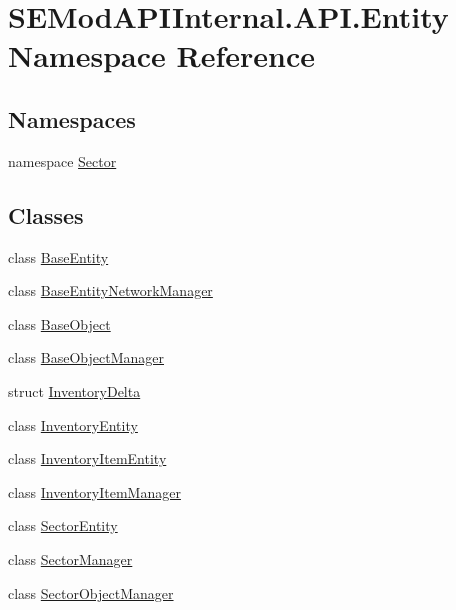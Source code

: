 \hypertarget{namespace_s_e_mod_a_p_i_internal_1_1_a_p_i_1_1_entity}{}\section{S\+E\+Mod\+A\+P\+I\+Internal.\+A\+P\+I.\+Entity Namespace Reference}
\label{namespace_s_e_mod_a_p_i_internal_1_1_a_p_i_1_1_entity}
\subsection*{Namespaces}
\begin{DoxyCompactItemize}
\item 
namespace \hyperlink{namespace_s_e_mod_a_p_i_internal_1_1_a_p_i_1_1_entity_1_1_sector}{Sector}
\end{DoxyCompactItemize}
\subsection*{Classes}
\begin{DoxyCompactItemize}
\item 
class \hyperlink{class_s_e_mod_a_p_i_internal_1_1_a_p_i_1_1_entity_1_1_base_entity}{Base\+Entity}
\item 
class \hyperlink{class_s_e_mod_a_p_i_internal_1_1_a_p_i_1_1_entity_1_1_base_entity_network_manager}{Base\+Entity\+Network\+Manager}
\item 
class \hyperlink{class_s_e_mod_a_p_i_internal_1_1_a_p_i_1_1_entity_1_1_base_object}{Base\+Object}
\item 
class \hyperlink{class_s_e_mod_a_p_i_internal_1_1_a_p_i_1_1_entity_1_1_base_object_manager}{Base\+Object\+Manager}
\item 
struct \hyperlink{struct_s_e_mod_a_p_i_internal_1_1_a_p_i_1_1_entity_1_1_inventory_delta}{Inventory\+Delta}
\item 
class \hyperlink{class_s_e_mod_a_p_i_internal_1_1_a_p_i_1_1_entity_1_1_inventory_entity}{Inventory\+Entity}
\item 
class \hyperlink{class_s_e_mod_a_p_i_internal_1_1_a_p_i_1_1_entity_1_1_inventory_item_entity}{Inventory\+Item\+Entity}
\item 
class \hyperlink{class_s_e_mod_a_p_i_internal_1_1_a_p_i_1_1_entity_1_1_inventory_item_manager}{Inventory\+Item\+Manager}
\item 
class \hyperlink{class_s_e_mod_a_p_i_internal_1_1_a_p_i_1_1_entity_1_1_sector_entity}{Sector\+Entity}
\item 
class \hyperlink{class_s_e_mod_a_p_i_internal_1_1_a_p_i_1_1_entity_1_1_sector_manager}{Sector\+Manager}
\item 
class \hyperlink{class_s_e_mod_a_p_i_internal_1_1_a_p_i_1_1_entity_1_1_sector_object_manager}{Sector\+Object\+Manager}
\end{DoxyCompactItemize}
